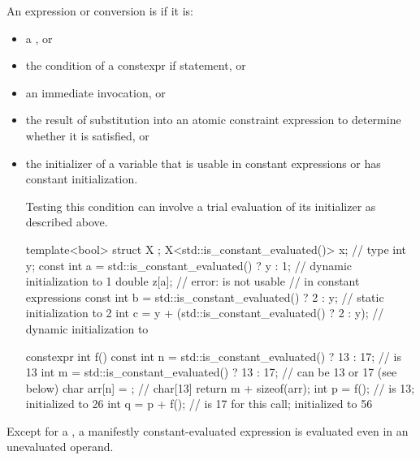 \pnum
An expression or conversion is 
if it is:
\begin{itemize}
\item a , or
\item the condition of a constexpr if statement, or
\item an immediate invocation, or
\item the result of substitution into an atomic constraint expression
to determine whether it is satisfied, or
\item the initializer of a variable
that is usable in constant expressions or
has constant initialization.
\begin{footnote}
Testing this condition
can involve a trial evaluation of its initializer as described above.
\end{footnote}
\begin{example}
\begin{codeblock}
template<bool> struct X {};
X<std::is_constant_evaluated()> x;                      // type 
int y;
const int a = std::is_constant_evaluated() ? y : 1;     // dynamic initialization to 1
double z[a];                                            // error:  is not usable
                                                        // in constant expressions
const int b = std::is_constant_evaluated() ? 2 : y;     // static initialization to 2
int c = y + (std::is_constant_evaluated() ? 2 : y);     // dynamic initialization to 

constexpr int f() {
  const int n = std::is_constant_evaluated() ? 13 : 17; //  is 13
  int m = std::is_constant_evaluated() ? 13 : 17;       //  can be 13 or 17 (see below)
  char arr[n] = {}; // char[13]
  return m + sizeof(arr);
}
int p = f();                                            //  is 13; initialized to 26
int q = p + f();                                        //  is 17 for this call; initialized to 56
\end{codeblock}
\end{example}
\end{itemize}
\begin{note}
Except for a ,
a manifestly constant-evaluated expression
is evaluated even in an unevaluated operand.
\end{note}


